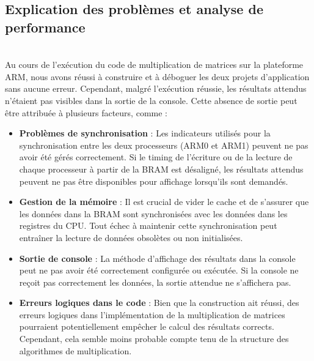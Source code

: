 \documentclass[../CSC_5RO06_TA.tex]{subfiles}
\begin{document}
\subsection{Explication des problèmes et analyse de performance}
\\
Au cours de l'exécution du code de multiplication de matrices sur la plateforme ARM, nous avons réussi à construire et à déboguer les deux projets d'application sans aucune erreur. Cependant, malgré l'exécution réussie, les résultats attendus n'étaient pas visibles dans la sortie de la console. Cette absence de sortie peut être attribuée à plusieurs facteurs, comme :
\\
\begin{itemize}
    \item \textbf{Problèmes de synchronisation} : Les indicateurs utilisés pour la synchronisation entre les deux processeurs (ARM0 et ARM1) peuvent ne pas avoir été gérés correctement. Si le timing de l'écriture ou de la lecture de chaque processeur à partir de la BRAM est désaligné, les résultats attendus peuvent ne pas être disponibles pour affichage lorsqu'ils sont demandés.

    \item \textbf{Gestion de la mémoire} : Il est crucial de vider le cache et de s'assurer que les données dans la BRAM sont synchronisées avec les données dans les registres du CPU. Tout échec à maintenir cette synchronisation peut entraîner la lecture de données obsolètes ou non initialisées.

    \item \textbf{Sortie de console} : La méthode d'affichage des résultats dans la console peut ne pas avoir été correctement configurée ou exécutée. Si la console ne reçoit pas correctement les données, la sortie attendue ne s'affichera pas.

    \item \textbf{Erreurs logiques dans le code} : Bien que la construction ait réussi, des erreurs logiques dans l'implémentation de la multiplication de matrices pourraient potentiellement empêcher le calcul des résultats corrects. Cependant, cela semble moins probable compte tenu de la structure des algorithmes de multiplication.
\end{itemize}
\\
\end{document}
